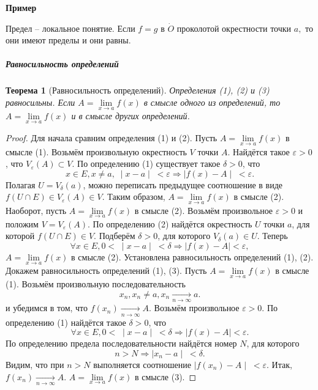 \documentclass{article}
\newtheorem{Theorem}{Теорема}[section]
\begin{document}
\par\medskip \textbf{Пример}\par


Предел -- локальное понятие. Если $f=g$ в $\dot{O}$ проколотой окрестности точки $a,$ то они имеют пределы и они равны.

\subparagraph{Равносильность определений}
\begin{Theorem}[Равносильность определений]
Определения (1), (2) и (3) равносильны. Если $A=\lim\limits_{x \to a} f(x)$ в смысле одного из определений, то $A=\lim\limits_{x \to a} f(x)$ и в смысле других определений.
\end{Theorem}
\begin{proof}
Для начала сравним определения (1) и (2).
Пусть $A=\lim\limits_{x \to a} f(x)$ в смысле (1). Возьмём произвольную окрестность $V$ точки $A$. Найдётся такое $\varepsilon>0$, что $V_\varepsilon(A) \subset V$. По определению (1) существует такое $\delta > 0$, что
$$x \in E, x \neq a, \; \mid x - a \mid \; < \varepsilon \Rightarrow \mid f(x) - A \mid \; < \varepsilon.$$
Полагая $U = V_\delta (a)$, можно переписать предыдущее соотношение в виде $f(U \cap E) \in V_\varepsilon(A) \in V$. Таким образом, $A=\lim\limits_{x \to a} f(x)$ в смысле (2).
Наоборот, пусть $A=\lim\limits_{x \to a} f(x)$ в смысле (2). Возьмём произвольное $\varepsilon > 0$ и положим $V = V_\varepsilon(A)$. По определению (2) найдётся окрестность $U$ точки $a$, для которой $f(U \cap E) \in V$. Подберём $\delta > 0$, для которого $V_\delta(a) \in U$. Теперь
$$\forall x \in E, 0 < \; \mid x - a \mid \; < \delta \Rightarrow \mid f(x) - A \mid<\varepsilon,$$
$A=\lim\limits_{x \to a} f(x)$ в смысле (2). Установлена равносильность определений (1), (2).
Докажем равносильность определений (1), (3).
Пусть $A=\lim\limits_{x \to a} f(x)$ в смысле (1). Возьмём произвольную последовательность
$${x_n}, x_n \neq a, x_n \xrightarrow[n\rightarrow\infty]{} a.$$
и убедимся в том, что $f(x_n) \xrightarrow[n\rightarrow\infty]{} A.$
Возьмём произвольное $\varepsilon > 0$. По определению (1) найдётся такое $\delta > 0$, что
$$\forall x \in E, 0 < \; \mid x - a \mid \; < \delta \Rightarrow \mid f(x) - A \mid < \varepsilon.$$
По определению предела последовательности найдётся номер $N$, для которого
$$ n > N \Rightarrow \mid x_n - a \mid \; < \delta.$$
Видим, что при $n > N$ выполняется соотношение $\mid f(x_n) - A \mid \;  < \varepsilon.$ Итак, $f(x_n) \xrightarrow[n\rightarrow\infty]{} A.$ $A=\lim\limits_{x \to a} f(x)$ в смысле (3).

\end{proof}
\end{document}
